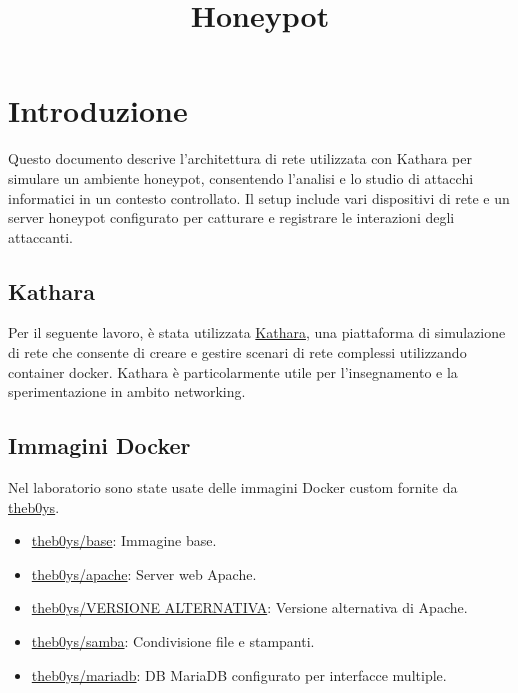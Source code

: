 \documentclass[a4paper,12pt]{article}
\title{Honeypot}
\author{}
\date{}
\begin{document}
\maketitle

\tableofcontents
\newpage

\section{Introduzione} \label{1-introduzione}
Questo documento descrive l'architettura di rete utilizzata con Kathara per simulare un ambiente honeypot, consentendo l'analisi e lo studio di attacchi informatici in un contesto controllato. Il setup include vari dispositivi di rete e un server honeypot configurato per catturare e registrare le interazioni degli attaccanti.

\subsection{Kathara} \label{11-kathara}
Per il seguente lavoro, è stata utilizzata \href{https://www.kathara.org/}{Kathara}, una piattaforma di simulazione di rete che consente di creare e gestire scenari di rete complessi utilizzando container docker. Kathara è particolarmente utile per l'insegnamento e la sperimentazione in ambito networking.

\subsection{Immagini Docker} \label{12-immagini-docker}
Nel laboratorio sono state usate delle immagini Docker custom fornite da \href{https://hub.docker.com/u/theb0ys}{theb0ys}.

\begin{itemize}
    \item \href{https://hub.docker.com/r/theb0ys/base}{theb0ys/base}: Immagine base.
    \item \href{https://hub.docker.com/r/theb0ys/apache}{theb0ys/apache}: Server web Apache.
    \item \href{https://hub.docker.com/r/theb0ys/apache}{theb0ys/VERSIONE ALTERNATIVA}: Versione alternativa di Apache.
    \item \href{https://hub.docker.com/r/theb0ys/samba}{theb0ys/samba}: Condivisione file e stampanti.
    \item \href{https://hub.docker.com/r/theb0ys/mariadb}{theb0ys/mariadb}: DB MariaDB configurato per interfacce multiple.
\end{itemize}
\end{document}
